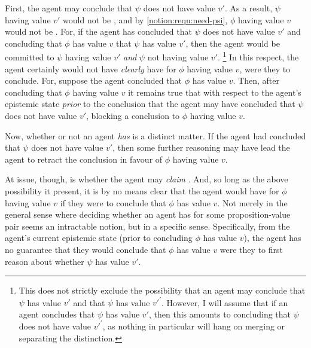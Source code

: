 \begin{note}
  First, the agent may conclude that \(\psi\) does not have value \(v'\).
  As a result, \(\psi\) having value \(v'\) would not be \epVAd{}, and by \ref{notion:requ:need-psi}, \(\phi\) having value \(v\) would not be \epVAd{}.
  For, if the agent has concluded that \(\psi\) does not have value \(v'\) and concluding that \(\phi\) has value \(v\)  that \(\psi\) has value \(v'\), then the agent would be committed to \(\psi\) having value \(v'\) \emph{and} \(\psi\) not having value \(v'\).\nolinebreak
  \footnote{
    This does not strictly exclude the possibility that an agent may conclude that \(\psi\) has value \(v'\) and that \(\psi\) has value \(v'^{'}\).
    However, I will assume that if an agent concludes that \(\psi\) has value \(v'\), then this amounts to concluding that \(\psi\) does not have value \(v'^{'}\), as nothing in particular will hang on merging or separating the distinction.
  }
  In this respect, the agent certainly would not have \emph{clearly} have \support{} for \(\phi\) having value \(v\), were they to conclude.
  For, suppose the agent concluded that \(\phi\) has value \(v\).
  Then, after concluding that \(\phi\) having value \(v\) it remains true that with respect to the agent's epistemic state \emph{prior} to the conclusion that the agent may have concluded that \(\psi\) does not have value \(v'\), blocking a conclusion to \(\phi\) having value \(v\).

  Now, whether or not an agent \emph{has} \support{} is a distinct matter.
  If the agent had concluded that \(\psi\) does not have value \(v'\), then some further reasoning may have lead the agent to retract the conclusion in favour of \(\phi\) having value \(v\).

  At issue, though, is whether the agent may \emph{claim} \support{}.
  And, so long as the above possibility it present, it is by no means clear that the agent would have \support{} for \(\phi\) having value \(v\) if they were to conclude that \(\phi\) has value \(v\).
  Not merely in the general sense where deciding whether an agent has \support{} for some proposition-value pair seems an intractable notion, but in a specific sense.
  Specifically, from the agent's current epistemic state (prior to concluding \(\phi\) has value \(v\)), the agent has no guarantee that they would conclude that \(\phi\) has value \(v\) were they to first reason about whether \(\psi\) has value \(v'\).
\end{note}

